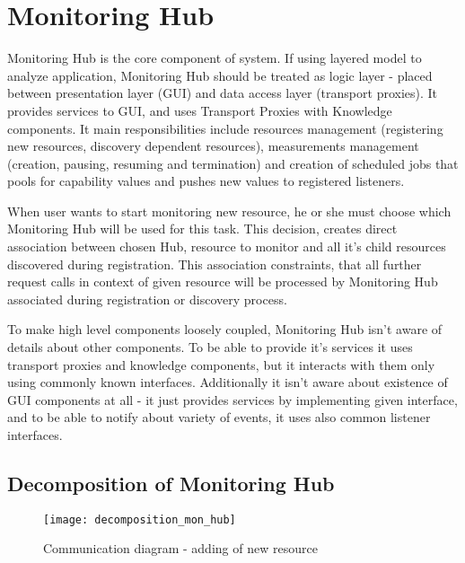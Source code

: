 %


\section{Monitoring Hub}
\label{sec:arch_monitoring_hub}


Monitoring Hub is the core component of system. If using layered model to analyze application, Monitoring Hub should be
treated as logic layer - placed between presentation layer (GUI) and data access layer (transport proxies). It
provides services to GUI, and uses Transport Proxies with Knowledge components.
It main responsibilities include resources management (registering new resources, discovery dependent resources),
measurements management (creation, pausing, resuming and termination) and creation of scheduled jobs that pools for
capability values and pushes new values to registered listeners. 

When user wants to start monitoring new resource, he or she must choose which Monitoring Hub will be used for this
task. This decision, creates direct association between chosen Hub, resource to monitor and all it's
child resources discovered during registration. This association constraints, that all further request calls in
context of given resource will be processed by Monitoring Hub associated during registration or discovery process.

To make high level components loosely coupled, Monitoring Hub isn't aware of details about other components. To be able
to provide it's services it uses transport proxies and knowledge components, but it interacts with them only using
commonly known interfaces. Additionally it isn't aware about existence of GUI components at all - it just provides
services by implementing given interface, and to be able to notify about variety of events, it uses also common listener
interfaces.

\subsection{Decomposition of Monitoring Hub}

\begin{figure}[ht]
  \centering
  \texttt{[image: decomposition\_mon\_hub]}
  \caption{Communication diagram - adding of new resource}
  \label{fig:decomposition_mon_hub}
\end{figure}

